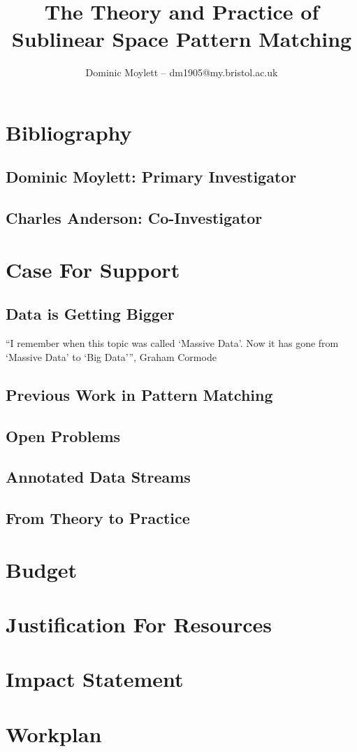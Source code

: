 \documentclass[a4paper,11pt]{article}
\title{The Theory and Practice of Sublinear Space Pattern Matching}
\author{Dominic Moylett -- dm1905@my.bristol.ac.uk}
\begin{document}
    \maketitle

    \section{Bibliography}

    \subsection{Dominic Moylett: Primary Investigator}

    \subsection{Charles Anderson: Co-Investigator}

    \section{Case For Support}

    \subsection{Data is Getting Bigger}

    ``I remember when this topic was called `Massive Data'. Now it has gone from `Massive Data' to ‘Big Data’'', Graham Cormode \cite{cormode:massive-data}

    \subsection{Previous Work in Pattern Matching}

    \subsection{Open Problems}

    \subsection{Annotated Data Streams}

    \subsection{From Theory to Practice}

    \section{Budget}

    \section{Justification For Resources}

    \section{Impact Statement}

    \section{Workplan}

    
\end{document}
